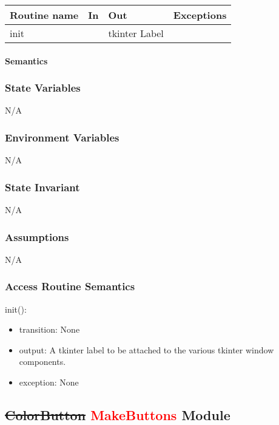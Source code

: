 \documentclass[12pt]{article}
\begin{document}
\begin{tabular}{| l | l | l | l |}
\hline
\textbf{Routine name} & \textbf{In} & \textbf{Out} & \textbf{Exceptions}\\
\hline
init & & tkinter Label & \\
\hline
\end{tabular}

\paragraph* {Semantics}

\subsubsection*{State Variables}

N/A

\subsubsection*{Environment Variables}

N/A

\subsubsection*{State Invariant}

N/A

\subsubsection*{Assumptions}

N/A

\subsubsection* {Access Routine Semantics}

\noindent init():
\begin{itemize}
\item transition: None
\item output: A tkinter label to be attached to the various tkinter window components.
\item exception: None
\end{itemize}

\subsection*{\sout{ColorButton} \textcolor{red}{MakeButtons} Module}
\end{document}
